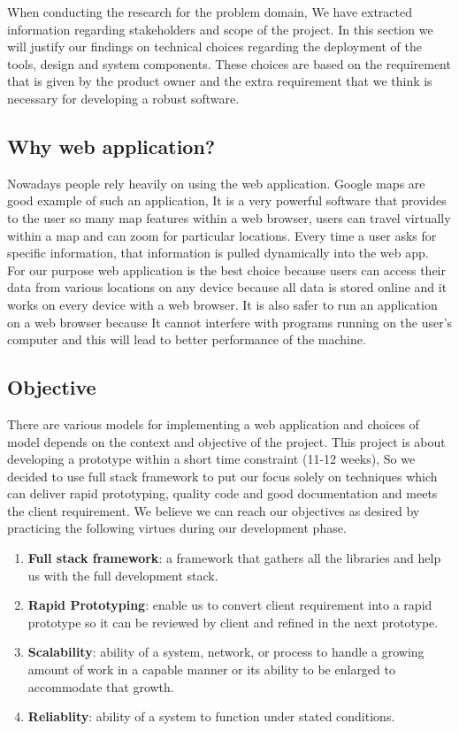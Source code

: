 When conducting the research for the problem domain, We have extracted information regarding stakeholders and scope of the project. In this section we will justify our findings on technical choices regarding the deployment of the tools, design and system components. These choices are based on the requirement that is given by the product owner and the extra requirement that we think is necessary for developing a robust software.   

\subsection{Why web application?}
Nowadays people rely heavily on using the web application. Google maps are good example of such an application, It is a very powerful software that provides to the user so many map features within a web browser, users can travel virtually within a map and can zoom for particular locations. Every time a user asks for specific information, that information is pulled dynamically into the web app.\\
 For our purpose web application is the best choice because users can access their data from various locations on any device because all data is stored online and it works on every device with a web browser. It is also safer to run an application on a web browser because It cannot interfere with programs running on the user's computer and this will lead to better performance of the machine.

\subsection{Objective}
 There are various models for implementing a web application and choices of model depends on the context and objective of the project. This project is about developing a prototype within a short time constraint (11-12 weeks), So we decided to use full stack framework to put our focus solely on techniques which can deliver rapid prototyping, quality code and good documentation and meets the client requirement. We believe we can reach our objectives as desired by practicing the following virtues during our development phase. 

\begin{enumerate}
	\item \textbf{Full stack framework}: a framework that gathers all the libraries and help us with the full development stack.
	\item \textbf{Rapid Prototyping}: enable us to convert client requirement into a rapid prototype so it can be reviewed by client and refined in the next prototype.
	\item \textbf{Scalability}: ability of a system, network, or process to handle a growing amount of work in a capable manner or its ability to be enlarged to accommodate that growth.\cite{wiki:scalability}
	\item \textbf{Reliablity}: ability of a system to function under stated conditions.
\end{enumerate}
